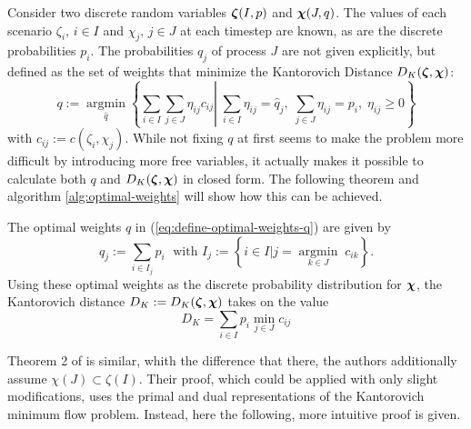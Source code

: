Consider two discrete random variables $\boldsymbol\zeta(I,p)$ and $\boldsymbol\chi(J,q)$.
The values of each scenario $\zeta_i,\, i\in I$ and $\chi_j,\, j\in J$ at each timestep are known, as are the discrete probabilities $p_i$.
The probabilities $q_j$ of process $J$ are not given explicitly, but defined as the set of weights that minimize the Kantorovich Distance $D_K(\boldsymbol\zeta,\boldsymbol\chi)$:
\begin{equation}
  \label{eq:define-optimal-weights-q}
  q := \underset{\hat{q}}{\operatorname{argmin}}\left\{\sum_{i\in I}\sum_{j\in J}\eta_{ij}c_{ij}\left|\; \sum_{i\in I}\eta_{ij} = \hat{q}_j,\; \sum_{j\in J}\eta_{ij} = p_i,\;\eta_{ij}\geq 0\right.\right\}
\end{equation}
with $c_{ij} := c(\zeta_i,\chi_j)$.
While not fixing $q$ at first seems to make the problem more difficult by introducing more free variables, it actually makes it possible to calculate both $q$ and $D_K(\boldsymbol\zeta,\boldsymbol\chi)$ in closed form.
The following theorem and algorithm \ref{alg:optimal-weights} will show how this can be achieved.
\begin{thm}
  \label{thm:optimal-weights}
  The optimal weights $q$ in (\ref{eq:define-optimal-weights-q}) are given by
  \begin{equation}
    \label{eq:optimal-weights-in-thm}
    q_j := \sum_{i\in I_j} p_i\;\text{ with } I_j:=\left\{i\in I| j = \underset{k\in J}{\operatorname{argmin}}\; c_{ik}\right\}.
  \end{equation}
  Using these optimal weights as the discrete probability distribution for $\boldsymbol\chi$, the Kantorovich distance $D_K:=D_K(\boldsymbol\zeta,\boldsymbol\chi)$ takes on the value
  \begin{equation}
    \label{eq:define-Dk-optimalweights-thm}
    D_K = \sum_{i\in I}p_i\min\limits_{j\in J}c_{ij}
  \end{equation}
\end{thm}
Theorem 2 of \citet{Dupacova2003} is similar, whith the difference that there, the authors additionally assume $\chi(J)\subset \zeta(I)$.
Their proof, which could be applied with only slight modifications, uses the primal and dual representations of the Kantorovich minimum flow problem.
Instead, here the following, more intuitive proof is given.

